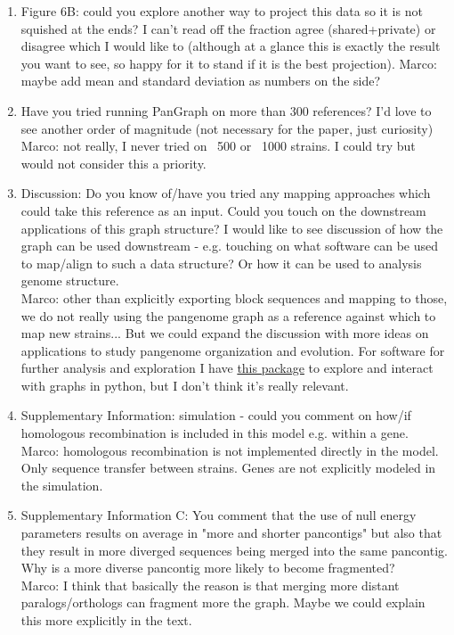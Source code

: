 \documentclass{article}
\newcommand{\Marco}[1]{{\color{gray}Marco: #1}}
\begin{document}
\begin{enumerate}
    \item Figure 6B: could you explore another way to project this data so it is not squished at the ends? I can't read off the fraction agree (shared+private) or disagree which I would like to (although at a glance this is exactly the result you want to see, so happy for it to stand if it is the best projection).
          \Marco{maybe add mean and standard deviation as numbers on the side?}

    \item Have you tried running PanGraph on more than 300 references? I'd love to see another order of magnitude (not necessary for the paper, just curiosity)
          \Marco{not really, I never tried on ~500 or ~1000 strains. I could try but would not consider this a priority.}

    \item Discussion: Do you know of/have you tried any mapping approaches which could take this reference as an input. Could you touch on the downstream applications of this graph structure? I would like to see discussion of how the graph can be used downstream - e.g. touching on what software can be used to map/align to such a data structure? Or how it can be used to analysis genome structure.\\
          \Marco{other than explicitly exporting block sequences and mapping to those, we do not really using the pangenome graph as a reference against which to map new strains... But we could expand the discussion with more ideas on applications to study pangenome organization and evolution. For software for further analysis and exploration I have \href{https://github.com/mmolari/pypangraph}{this package} to explore and interact with graphs in python, but I don't think it's really relevant.}

    \item Supplementary Information: simulation - could you comment on how/if homologous recombination is included in this model e.g. within a gene.\\
          \Marco{homologous recombination is not implemented directly in the model. Only sequence transfer between strains. Genes are not explicitly modeled in the simulation.}

    \item Supplementary Information C: You comment that the use of null energy parameters results on average in "more and shorter pancontigs" but also that they result in more diverged sequences being merged into the same pancontig. Why is a more diverse pancontig more likely to become fragmented?\\
          \Marco{I think that basically the reason is that merging more distant paralogs/orthologs can fragment more the graph. Maybe we could explain this more explicitly in the text.}
\end{enumerate}
\end{document}

